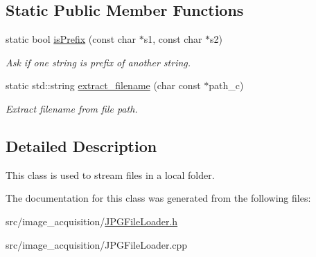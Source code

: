 \subsection*{Static Public Member Functions}
\begin{DoxyCompactItemize}
\item 
\mbox{\label{classimage__acquisition_1_1_file_loader_adeda4d86794f929b413f1108632ee62a}} 
static bool \mbox{\hyperlink{classimage__acquisition_1_1_file_loader_adeda4d86794f929b413f1108632ee62a}{is\+Prefix}} (const char $\ast$s1, const char $\ast$s2)
\begin{DoxyCompactList}\small\item\em Ask if one string is prefix of another string. \end{DoxyCompactList}\item 
\mbox{\label{classimage__acquisition_1_1_file_loader_a3e2e84b7718b187c38dd4960eb37a227}} 
static std\+::string \mbox{\hyperlink{classimage__acquisition_1_1_file_loader_a3e2e84b7718b187c38dd4960eb37a227}{extract\+\_\+filename}} (char const $\ast$path\+\_\+c)
\begin{DoxyCompactList}\small\item\em Extract filename from file path. \end{DoxyCompactList}\end{DoxyCompactItemize}


\subsection{Detailed Description}
This class is used to stream files in a local folder. 

The documentation for this class was generated from the following files\+:\begin{DoxyCompactItemize}
\item 
src/image\+\_\+acquisition/\mbox{\hyperlink{_j_p_g_file_loader_8h}{J\+P\+G\+File\+Loader.\+h}}\item 
src/image\+\_\+acquisition/J\+P\+G\+File\+Loader.\+cpp\end{DoxyCompactItemize}
